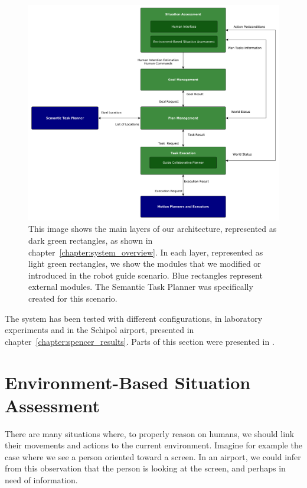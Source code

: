 \begin{figure}[ht!]
	\centering
	\includegraphics[scale=0.38]{img/case_study/spencer/architecture.pdf}
	\caption[Robot guide architecture]{This image shows the main layers of our architecture, represented as dark green rectangles, as shown in chapter~\ref{chapter:system_overview}. In each layer, represented as light green rectangles, we show the modules that we modified or introduced in the robot guide scenario. Blue rectangles represent external modules. The Semantic Task Planner was specifically created for this scenario.}
	\label{fig:spencer-architecture}
\end{figure}

The system has been tested with different configurations, in laboratory experiments and in the Schipol airport, presented in chapter~\ref{chapter:spencer_results}. Parts of this section were presented in \cite{fiore2015adaptive}.

\section{Environment-Based Situation Assessment}
\label{sec:spencer-intention}
There are many situations where, to properly reason on humans, we should link their movements and actions to the current environment. Imagine for example the case where we see a person oriented toward a screen. In an airport, we could infer from this observation that the person is looking at the screen, and perhaps in need of information. 

